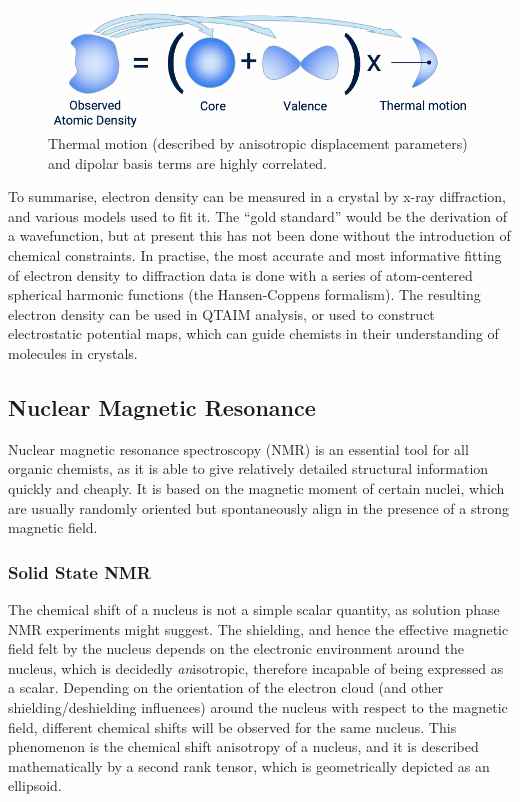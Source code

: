 \begin{refsection}
\begin{figure}
    \centering
    \includegraphics[width=0.6\linewidth]{Figures/valencevsthermaled.pdf}
    \caption[Correlation of thermal and dipolar functions.]{Thermal motion (described by anisotropic displacement parameters) and dipolar basis terms are highly correlated.}
    \label{fig:adp-dipole}
\end{figure}

To summarise, electron density can be measured in a crystal by x-ray diffraction, and various models used to fit it.
The ``gold standard'' would be the derivation of a wavefunction, but at present this has not been done without the introduction of chemical constraints.
In practise, the most accurate and most informative fitting of electron density to diffraction data is done with a series of atom-centered spherical harmonic functions (the Hansen-Coppens formalism).
The resulting electron density can be used in QTAIM analysis, or used to construct electrostatic potential maps, which can guide chemists in their understanding of molecules in crystals.

\subsection{Nuclear Magnetic Resonance}
Nuclear magnetic resonance spectroscopy (NMR) is an essential tool for all organic chemists, as it is able to give relatively detailed structural information quickly and cheaply.
It is based on the magnetic moment of certain nuclei, which are usually randomly oriented but spontaneously align in the presence of a strong magnetic field.

\subsubsection{Solid State NMR}
The chemical shift of a nucleus is not a simple scalar quantity, as solution phase NMR experiments might suggest.
The shielding, and hence the effective magnetic field felt by the nucleus depends on the electronic environment around the nucleus, which is decidedly \emph{an}isotropic, therefore incapable of being expressed as a scalar.
Depending on the orientation of the electron cloud (and other shielding/deshielding influences) around the nucleus with respect to the magnetic field, different chemical shifts will be observed for the same nucleus.
This phenomenon is the chemical shift anisotropy of a nucleus, and it is described mathematically by a second rank tensor, which is geometrically depicted as an ellipsoid.


\end{refsection}
